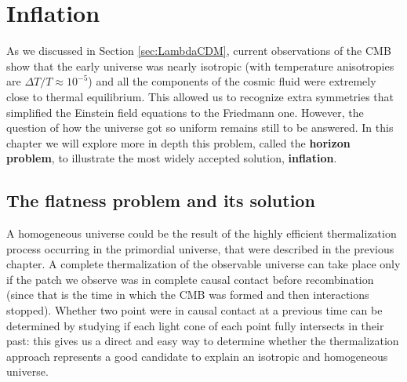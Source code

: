 \chapter{Inflation}
\label{chap:inflation}
As we discussed in Section \ref{sec:LambdaCDM}, current observations of the CMB show that the early universe was nearly isotropic (with temperature anisotropies are $\Delta T/T\approx 10^{-5}$) and all the components of the cosmic fluid were extremely close to thermal equilibrium. This allowed us to recognize extra symmetries that simplified the Einstein field equations to the Friedmann one. However, the question of how the universe got so uniform remains still to be answered. In this chapter we will explore more in depth this problem, called the \textbf{horizon problem}, to illustrate the most widely accepted solution, \textbf{inflation}.
\section{The flatness problem and its solution}
A homogeneous universe could be the result of the highly efficient thermalization process occurring in the primordial universe, that were described in the previous chapter. A complete thermalization of the observable universe can take place only if the patch we observe was in complete causal contact before recombination (since that is the time in which the CMB was formed and then interactions stopped). Whether two point were in causal contact at a previous time can be determined by studying if each light cone of each point fully intersects in their past: this gives us a direct and easy way to determine whether the thermalization approach represents a good candidate to explain an isotropic and homogeneous universe. 

